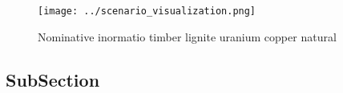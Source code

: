 \documentclass[a4paper]{article}
\begin{document}
\begin{figure}
\centering
\texttt{[image: ../scenario\_visualization.png]}
\caption{Nominative inormatio timber lignite uranium copper natural 
}
\end{figure}
 
\subsection{SubSection}
\end{document}
